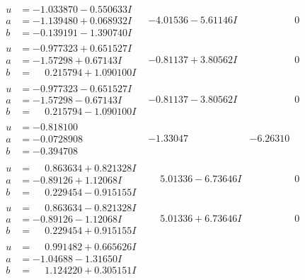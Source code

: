 \documentclass[1p]{elsarticle_modified}
\theoremstyle{definition}
\begin{document}
$$\begin{array}{c|c|c}
\begin{aligned}
u &= -1.033870 - 0.550633 I \\
a &= -1.139480 + 0.068932 I \\
b &= -0.139191 - 1.390740 I\end{aligned}
 & -4.01536 - 5.61146 I & \phantom{-0.000000 } 0 \\ \hline\begin{aligned}
u &= -0.977323 + 0.651527 I \\
a &= -1.57298 + 0.67143 I \\
b &= \phantom{-}0.215794 + 1.090100 I\end{aligned}
 & -0.81137 + 3.80562 I & \phantom{-0.000000 } 0 \\ \hline\begin{aligned}
u &= -0.977323 - 0.651527 I \\
a &= -1.57298 - 0.67143 I \\
b &= \phantom{-}0.215794 - 1.090100 I\end{aligned}
 & -0.81137 - 3.80562 I & \phantom{-0.000000 } 0 \\ \hline\begin{aligned}
u &= -0.818100\phantom{ +0.000000I} \\
a &= -0.0728908\phantom{ +0.000000I} \\
b &= -0.394708\phantom{ +0.000000I}\end{aligned}
 & -1.33047\phantom{ +0.000000I} & -6.26310\phantom{ +0.000000I} \\ \hline\begin{aligned}
u &= \phantom{-}0.863634 + 0.821328 I \\
a &= -0.89126 + 1.12068 I \\
b &= \phantom{-}0.229454 - 0.915155 I\end{aligned}
 & \phantom{-}5.01336 - 6.73646 I & \phantom{-0.000000 } 0 \\ \hline\begin{aligned}
u &= \phantom{-}0.863634 - 0.821328 I \\
a &= -0.89126 - 1.12068 I \\
b &= \phantom{-}0.229454 + 0.915155 I\end{aligned}
 & \phantom{-}5.01336 + 6.73646 I & \phantom{-0.000000 } 0 \\ \hline\begin{aligned}
u &= \phantom{-}0.991482 + 0.665626 I \\
a &= -1.04688 - 1.31650 I \\
b &= \phantom{-}1.124220 + 0.305151 I\end{aligned}

\end{array}$$
\end{document}
